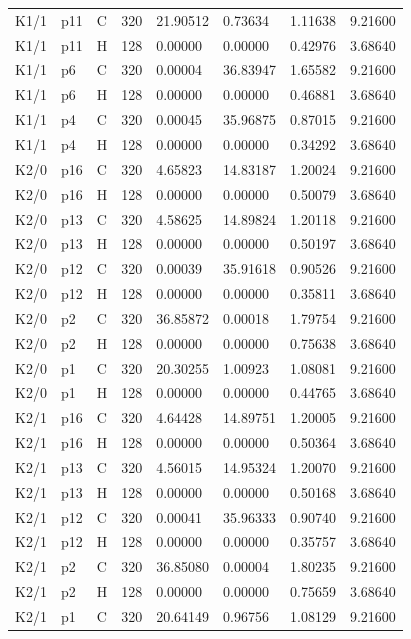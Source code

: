 \begin{longtable}{llllllll}
K1/1 & p11 & C & 320 & 21.90512 & 0.73634 & 1.11638 & 9.21600 \\
K1/1 & p11 & H & 128 & 0.00000 & 0.00000 & 0.42976 & 3.68640 \\
K1/1 & p6 & C & 320 & 0.00004 & 36.83947 & 1.65582 & 9.21600 \\
K1/1 & p6 & H & 128 & 0.00000 & 0.00000 & 0.46881 & 3.68640 \\
K1/1 & p4 & C & 320 & 0.00045 & 35.96875 & 0.87015 & 9.21600 \\
K1/1 & p4 & H & 128 & 0.00000 & 0.00000 & 0.34292 & 3.68640 \\
K2/0 & p16 & C & 320 & 4.65823 & 14.83187 & 1.20024 & 9.21600 \\
K2/0 & p16 & H & 128 & 0.00000 & 0.00000 & 0.50079 & 3.68640 \\
K2/0 & p13 & C & 320 & 4.58625 & 14.89824 & 1.20118 & 9.21600 \\
K2/0 & p13 & H & 128 & 0.00000 & 0.00000 & 0.50197 & 3.68640 \\
K2/0 & p12 & C & 320 & 0.00039 & 35.91618 & 0.90526 & 9.21600 \\
K2/0 & p12 & H & 128 & 0.00000 & 0.00000 & 0.35811 & 3.68640 \\
K2/0 & p2 & C & 320 & 36.85872 & 0.00018 & 1.79754 & 9.21600 \\
K2/0 & p2 & H & 128 & 0.00000 & 0.00000 & 0.75638 & 3.68640 \\
K2/0 & p1 & C & 320 & 20.30255 & 1.00923 & 1.08081 & 9.21600 \\
K2/0 & p1 & H & 128 & 0.00000 & 0.00000 & 0.44765 & 3.68640 \\
K2/1 & p16 & C & 320 & 4.64428 & 14.89751 & 1.20005 & 9.21600 \\
K2/1 & p16 & H & 128 & 0.00000 & 0.00000 & 0.50364 & 3.68640 \\
K2/1 & p13 & C & 320 & 4.56015 & 14.95324 & 1.20070 & 9.21600 \\
K2/1 & p13 & H & 128 & 0.00000 & 0.00000 & 0.50168 & 3.68640 \\
K2/1 & p12 & C & 320 & 0.00041 & 35.96333 & 0.90740 & 9.21600 \\
K2/1 & p12 & H & 128 & 0.00000 & 0.00000 & 0.35757 & 3.68640 \\
K2/1 & p2 & C & 320 & 36.85080 & 0.00004 & 1.80235 & 9.21600 \\
K2/1 & p2 & H & 128 & 0.00000 & 0.00000 & 0.75659 & 3.68640 \\
K2/1 & p1 & C & 320 & 20.64149 & 0.96756 & 1.08129 & 9.21600 \\

\end{longtable}
